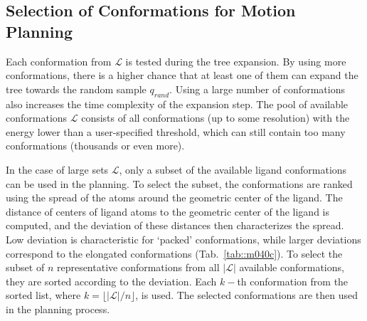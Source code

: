 \documentclass[usletter, 10pt, conference]{ieeeconf} %
\def\qrand{q_{rand}}
\def\L{\mathcal{L}}
\begin{document}
\subsection{Selection of Conformations for Motion Planning}
\label{sec::strat}

Each conformation from $\L$ is tested during the tree expansion. %
By using more conformations, there is a higher chance that at least one of them can expand the tree towards the random sample $\qrand$.
Using a large number of conformations also increases the time complexity of the expansion step.
The pool of available conformations $\L$ consists of all conformations (up to some resolution) with the energy lower than a user-specified threshold, which can still contain too many conformations (thousands or even more).

In the case of large sets $\L$, only a subset of the available ligand conformations can be used in the planning.
To select the subset, the conformations are ranked using the spread of the atoms around the geometric center of the ligand.
The distance of centers of ligand atoms to the geometric center of the ligand is computed, and the deviation of these
distances then characterizes the spread.
Low deviation is characteristic for `packed' conformations, while larger deviations correspond to the elongated conformations (Tab.~\ref{tab::m040c}).
To select the subset of $n$ representative conformations from all $|\L|$ available conformations, they are sorted according to the deviation.
Each $k-$th conformation from the sorted list, where $k=\lfloor{|\L| / n}\rfloor$, is used.
The selected conformations are then used in the planning process.

\end{document}
